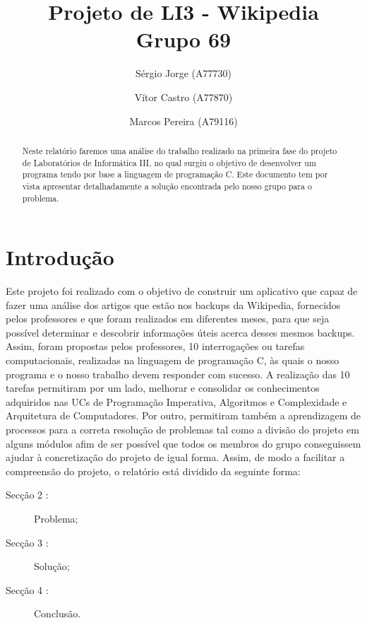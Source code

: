 \documentclass[a4paper]{article}
\title{Projeto de LI3 - Wikipedia\\Grupo 69}
\author{Sérgio Jorge (A77730) \and Vítor Castro (A77870) \and Marcos Pereira (A79116)}
\date{}
\begin{document}
\maketitle

\begin{abstract}
Neste relatório faremos uma análise do trabalho realizado na primeira fase do projeto de Laboratórios de Informática III, no qual surgiu o objetivo de desenvolver um programa tendo por base a linguagem de programação C. Este documento tem por vista apresentar detalhadamente a solução encontrada pelo nosso grupo para o problema.
\end{abstract}

\tableofcontents

\section{Introdução}
\label{sec:intro}
Este projeto foi realizado com o objetivo de construir um aplicativo que capaz de fazer uma análise dos artigos que estão nos backups da Wikipedia, fornecidos pelos professores e que foram realizados em diferentes meses, para que seja possível determinar e descobrir informações úteis acerca desses mesmos backups.
Assim, foram propostas pelos professores, 10 interrogações ou tarefas computacionais, realizadas na linguagem de programação C, às quais o nosso programa e o nosso trabalho devem responder com sucesso. A realização das 10 tarefas permitiram por um lado, melhorar e consolidar os conhecimentos adquiridos nas UCs de Programação Imperativa, Algoritmos e Complexidade e Arquitetura de Computadores. Por outro, permitiram também a aprendizagem de processos para a correta resolução de problemas tal como a divisão do projeto em alguns módulos afim de ser possível que todos os membros do grupo conseguissem ajudar à concretização do projeto de igual forma.
Assim, de modo a facilitar a compreensão do projeto, o relatório está dividido da seguinte forma:
\begin{description}
    \item[Secção 2 :] Problema;
    \item[Secção 3 :] Solução;
    \item[Secção 4 :] Conclusão.
\end{description}
\end{document}
